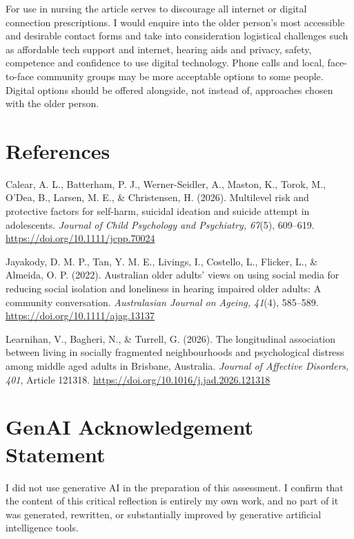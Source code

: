 \documentclass[12pt,a4paper]{article}
\newcommand{\referenceentry}[1]{%
  \par\noindent\hangindent=0.5in\hangafter=1 #1\par
}
\begin{document}
For use in nursing the article serves to discourage all internet or digital connection prescriptions. I would enquire into the older person's most accessible and desirable contact forms and take into consideration logistical challenges such as affordable tech support and internet, hearing aids and privacy, safety, competence and confidence to use digital technology. Phone calls and local, face-to-face community groups may be more acceptable options to some people. Digital options should be offered alongside, not instead of, approaches chosen with the older person.

\newpage
\section*{References}

\referenceentry{Calear, A. L., Batterham, P. J., Werner-Seidler, A., Maston, K., Torok, M., O'Dea, B., Larsen, M. E., \& Christensen, H. (2026). Multilevel risk and protective factors for self-harm, suicidal ideation and suicide attempt in adolescents. \textit{Journal of Child Psychology and Psychiatry, 67}(5), 609--619. \url{https://doi.org/10.1111/jcpp.70024}}

\referenceentry{Jayakody, D. M. P., Tan, Y. M. E., Livings, I., Costello, L., Flicker, L., \& Almeida, O. P. (2022). Australian older adults' views on using social media for reducing social isolation and loneliness in hearing impaired older adults: A community conversation. \textit{Australasian Journal on Ageing, 41}(4), 585--589. \url{https://doi.org/10.1111/ajag.13137}}

\referenceentry{Learnihan, V., Bagheri, N., \& Turrell, G. (2026). The longitudinal association between living in socially fragmented neighbourhoods and psychological distress among middle aged adults in Brisbane, Australia. \textit{Journal of Affective Disorders, 401}, Article 121318. \url{https://doi.org/10.1016/j.jad.2026.121318}}

\newpage
\section*{GenAI Acknowledgement Statement}
\noindent I did not use generative AI in the preparation of this assessment. I confirm that the content of this critical reflection is entirely my own work, and no part of it was generated, rewritten, or substantially improved by generative artificial intelligence tools.
\end{document}

